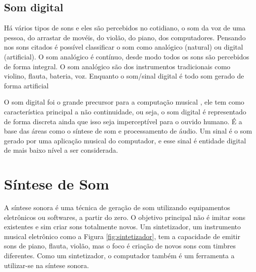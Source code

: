 \subsection{Som digital}
Há vários tipos de sons e eles são percebidos no cotidiano, o som da voz de uma pessoa, do arrastar de movéis, do violão, do piano, dos computadores. Pensando nos sons citados é possível classificar o som como analógico (natural) ou digital (artificial). O som analógico é contínuo, desde modo todos os sons são percebidos de forma integral. O som analógico são dos instrumentos tradicionais como violino, flauta, bateria, voz. Enquanto o som/sinal digital é todo som gerado de forma artificial

O som digital foi o grande precursor para a computação musical \cite{roads1996computer}, ele tem como característica principal a não continuidade, ou seja, o som digital é representado de forma discreta ainda que isso seja imperceptível para o ouvido humano. É a base das áreas como o síntese de som e processamento de áudio. Um sinal é o som gerado por uma aplicação musical do computador, e esse sinal é entidade digital de mais baixo nível a ser considerada. 


\section{Síntese de Som}
A síntese sonora é uma técnica de geração de som utilizando equipamentos eletrônicos ou softwares, a partir do zero. O objetivo principal não é imitar sons existentes e sim criar sons totalmente novos. Um sintetizador, um instrumento musical eletrônico como a Figura \ref{fig:sintetizador}, tem a capacidade de emitir sons de piano, flauta, violão, mas o foco é criação de novos sons com timbres diferentes. Como um sintetizador, o computador também é um ferramenta a utilizar-se na síntese sonora.

